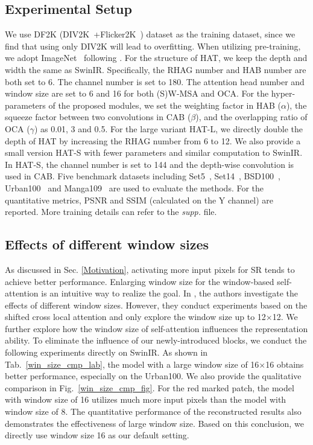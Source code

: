 \documentclass[10pt,twocolumn,letterpaper]{article}
\begin{document}
\subsection{Experimental Setup}
We use DF2K (DIV2K~\cite{div2k}+Flicker2K~\cite{flicker2k}) dataset as the training dataset, since we find that using only DIV2K will lead to overfitting. When utilizing pre-training, we adopt ImageNet~\cite{imagenet} following \cite{ipt,edt}. For the structure of HAT, we keep the depth and width the same as SwinIR. Specifically, the RHAG number and HAB number are both set to 6. The channel number is set to 180. The attention head number and window size are set to 6 and 16 for both (S)W-MSA and OCA. For the hyper-parameters of the proposed modules, we set the weighting factor in HAB ($\alpha$), the squeeze factor between two convolutions in CAB ($\beta$), and the overlapping ratio of OCA ($\gamma$) as 0.01, 3 and 0.5. For the large variant HAT-L, we directly double the depth of HAT by increasing the RHAG number from 6 to 12. We also provide a small version HAT-S with fewer parameters and similar computation to SwinIR. In HAT-S, the channel number is set to 144 and the depth-wise convolution is used in CAB. Five benchmark datasets including Set5~\cite{set5}, Set14~\cite{set14}, BSD100~\cite{bsd100}, Urban100~\cite{urban100} and Manga109~\cite{manga109} are used to evaluate the methods. For the quantitative metrics, PSNR and SSIM (calculated on the Y channel) are reported. More training details can refer to the \textit{supp.} file.

\subsection{Effects of different window sizes}
\label{cmp_win_size}
As discussed in Sec. \ref{Motivation}, activating more input pixels for SR tends to achieve better performance. 
Enlarging window size for the window-based self-attention is an intuitive way to realize the goal.
In \cite{edt}, the authors investigate the effects of different window sizes. However, they conduct experiments based on the shifted cross local attention and only explore the window size up to 12$\times$12. We further explore how the window size of self-attention influences the representation ability. To eliminate the influence of our newly-introduced blocks, we conduct the following experiments directly on SwinIR. As shown in Tab.~\ref{win_size_cmp_lab}, the model with a large window size of 16$\times$16 obtains better performance, especially on the Urban100. We also provide the qualitative comparison in Fig.~\ref{win_size_cmp_fig}. For the red marked patch, the model with window size of 16 utilizes much more input pixels than the model with window size of 8. The quantitative performance of the reconstructed results also demonstrates the effectiveness of large window size. Based on this conclusion, we directly use window size 16 as our default setting. 
\end{document}
